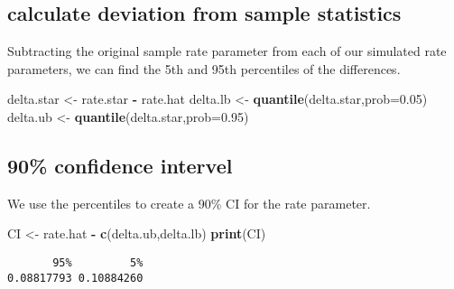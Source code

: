 \documentclass[]{book}
\newenvironment{Shaded}{\begin{snugshade}}{\end{snugshade}}
\newcommand{\KeywordTok}[1]{\textcolor[rgb]{0.13,0.29,0.53}{\textbf{#1}}}
\newcommand{\DataTypeTok}[1]{\textcolor[rgb]{0.13,0.29,0.53}{#1}}
\newcommand{\FloatTok}[1]{\textcolor[rgb]{0.00,0.00,0.81}{#1}}
\newcommand{\StringTok}[1]{\textcolor[rgb]{0.31,0.60,0.02}{#1}}
\newcommand{\OperatorTok}[1]{\textcolor[rgb]{0.81,0.36,0.00}{\textbf{#1}}}
\newcommand{\NormalTok}[1]{#1}
\theoremstyle{definition}
\theoremstyle{definition}
\theoremstyle{definition}
\theoremstyle{remark}
\begin{document}
\subsection{calculate deviation from sample
statistics}\label{calculate-deviation-from-sample-statistics}

Subtracting the original sample rate parameter from each of our
simulated rate parameters, we can find the 5th and 95th percentiles of
the differences.

\begin{Shaded}
\begin{Highlighting}[]
\NormalTok{delta.star <-}\StringTok{ }\NormalTok{rate.star }\OperatorTok{-}\StringTok{ }\NormalTok{rate.hat}
\NormalTok{delta.lb <-}\StringTok{ }\KeywordTok{quantile}\NormalTok{(delta.star,}\DataTypeTok{prob=}\FloatTok{0.05}\NormalTok{)}
\NormalTok{delta.ub <-}\StringTok{ }\KeywordTok{quantile}\NormalTok{(delta.star,}\DataTypeTok{prob=}\FloatTok{0.95}\NormalTok{)}
\end{Highlighting}
\end{Shaded}

\subsection{90\% confidence intervel}\label{confidence-intervel}

We use the percentiles to create a 90\% CI for the rate parameter.

\begin{Shaded}
\begin{Highlighting}[]
\NormalTok{CI <-}\StringTok{ }\NormalTok{rate.hat }\OperatorTok{-}\StringTok{ }\KeywordTok{c}\NormalTok{(delta.ub,delta.lb)}
\KeywordTok{print}\NormalTok{(CI)}
\end{Highlighting}
\end{Shaded}

\begin{verbatim}
       95%         5% 
0.08817793 0.10884260 
\end{verbatim}


\end{document}
